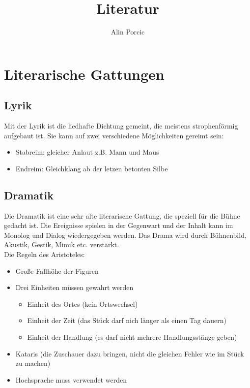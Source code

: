 \documentclass[12pt,a4paper]{article}
\title{Literatur}
\author{Alin Porcic}
\begin{document}
\maketitle
\newpage
\tableofcontents
\newpage

\section{Literarische Gattungen}
\subsection{Lyrik}

Mit der Lyrik ist die liedhafte Dichtung gemeint, die meistens strophenförmig aufgebaut ist. Sie kann auf zwei verschiedene Möglichkeiten gereimt sein:
	\begin{itemize}
	\item Stabreim: gleicher Anlaut z.B. Mann und Maus
	\item Endreim: Gleichklang ab der letzen betonten Silbe
	\end{itemize}

\subsection{Dramatik}

Die Dramatik ist eine sehr alte literarische Gattung, die speziell für die Bühne gedacht ist. Die Ereignisse spielen in der Gegenwart und der Inhalt kann im Monolog und Dialog wiedergegeben werden. Das Drama wird durch Bühnenbild, Akustik, Gestik, Mimik etc. verstärkt.\\
\newline
\newline
Die Regeln des Aristoteles:

	\begin{itemize}
	\item Große Fallhöhe der Figuren
	\item Drei Einheiten müssen gewahrt werden
		\begin{itemize}
		\item Einheit des Ortes (kein Ortswechsel)
		\item Einheit der Zeit (das Stück darf nich länger als einen Tag dauern)
		\item Einheit der Handlung (es darf nicht mehrere Handlungsstänge geben)
		\end{itemize}
	\item Kataris (die Zuschauer dazu bringen, nicht die gleichen Fehler wie im Stück zu machen)
	\item Hochsprache muss verwendet werden
	\end{itemize}
\end{document}
